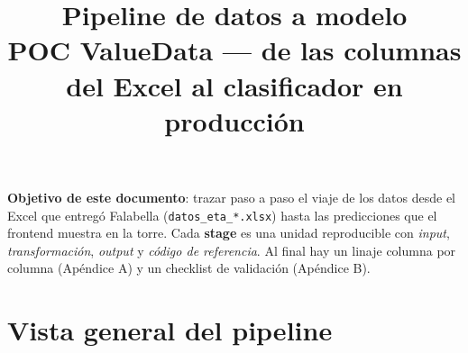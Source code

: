 \documentclass[11pt,a4paper]{article}
\title{\textbf{Pipeline de datos a modelo}\\[0.3em]
       \large POC ValueData --- de las columnas del Excel al clasificador en producción}
\author{}
\date{}
\newenvironment{quoteblock}{\begin{shaded}\noindent\ignorespaces}{\end{shaded}}
\begin{document}
\maketitle
\thispagestyle{empty}
\vspace{-2em}

\begin{quoteblock}
\textbf{Objetivo de este documento}: trazar paso a paso el viaje de los datos desde el Excel que entregó Falabella (\texttt{datos\_eta\_*.xlsx}) hasta las predicciones que el frontend muestra en la torre. Cada \textbf{stage} es una unidad reproducible con \emph{input}, \emph{transformación}, \emph{output} y \emph{código de referencia}. Al final hay un linaje columna por columna (Apéndice A) y un checklist de validación (Apéndice B).
\end{quoteblock}

\section{Vista general del pipeline}
\end{document}
